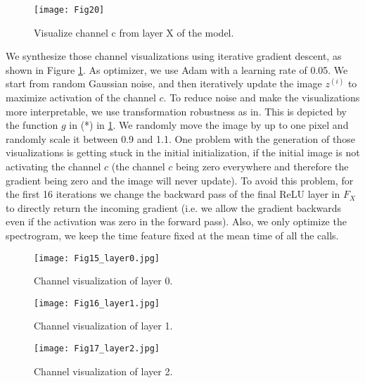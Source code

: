 \documentclass[preprint,NumberedRefs]{JASA}
\begin{document}
\begin{figure}[ht]
    \texttt{[image: Fig20]}
    \caption{\label{fig:channel_visualization}{Visualize channel c from layer X of the model.}}
\end{figure}

    We synthesize those channel visualizations using iterative gradient descent, as shown in Figure \ref{fig:channel_visualization}.
    As optimizer, we use Adam with a learning rate of 0.05. \cite{kingma_adam_2015}
    We start from random Gaussian noise, and then iteratively update the image $z^{(i)}$ to maximize activation of the channel $c$.
    To reduce noise and make the visualizations more interpretable, we use transformation robustness as in. \cite{olah2017feature}
    This is depicted by the function $g$ in (*) in \ref{fig:channel_visualization}.
    We randomly move the image by up to one pixel and randomly scale it between 0.9 and 1.1.
    One problem with the generation of those visualizations is getting stuck in the initial initialization, if the initial image is not activating the channel $c$ (the channel $c$ being zero everywhere and therefore the gradient being zero and the image will never update).
    To avoid this problem, for the first 16 iterations we change the backward pass of the final ReLU layer in $F_X$ to directly return the incoming gradient (i.e. we allow the gradient backwards even if the activation was zero in the forward pass).
    Also, we only optimize the spectrogram, we keep the time feature fixed at the mean time of all the calls.

\begin{figure}[ht]
  
    \texttt{[image: Fig15\_layer0.jpg]}
    \caption{\label{fig:channel_layer0}{Channel visualization of layer 0.}}
    \end{figure}


\begin{figure}[ht]
    
        \texttt{[image: Fig16\_layer1.jpg]}
        \caption{\label{fig:channel_layer1}{Channel visualization of layer 1.}}
        \end{figure}
\begin{figure}[ht]
        \texttt{[image: Fig17\_layer2.jpg]}
        \caption{\label{fig:channel_layer2}{Channel visualization of layer 2.}}
        \end{figure}
\end{document}
